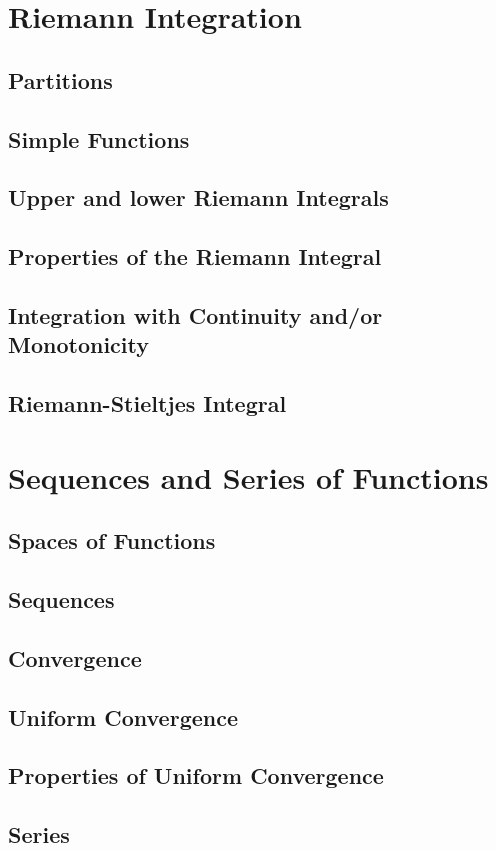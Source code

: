 \documentclass{article}
\theoremstyle{definition}
\begin{document}
\section{Riemann Integration}
\subsection{Partitions}
\subsection{Simple Functions}
\subsection{Upper and lower Riemann Integrals}
\subsection{Properties of the Riemann Integral}
\subsection{Integration with Continuity and/or Monotonicity}
\subsection{Riemann-Stieltjes Integral}
\section{Sequences and Series of Functions}
\subsection{Spaces of Functions}
\subsection{Sequences}
\subsection{Convergence}
\subsection{Uniform Convergence}
\subsection{Properties of Uniform Convergence}
\subsection{Series}
\end{document}
